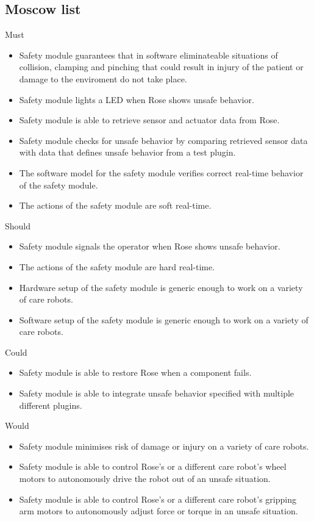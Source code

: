 \documentclass[12pt]{scrreprt}
\begin{document}
\subsection{Moscow list}
\label{MoSCoW list}
\begin{description}
\item Must
    \begin{itemize}
        \item Safety module guarantees that in software eliminateable situations of collision, clamping and pinching that could result in injury of the patient or damage to the enviroment do not take place. 
        \item Safety module lights a LED when Rose shows unsafe behavior.
        \item Safety module is able to retrieve sensor and actuator data from Rose.
        \item Safety module checks for unsafe behavior by comparing retrieved sensor data with data that defines unsafe behavior from a test plugin.
        \item The software model for the safety module verifies correct real-time behavior of the safety module.
        \item The actions of the safety module are soft real-time.
    \end{itemize}
\item Should
    \begin{itemize}
        \item Safety module signals the operator when Rose shows unsafe behavior.
        \item The actions of the safety module are hard real-time.
        \item Hardware setup of the safety module is generic enough to work on a variety of care robots.
        \item Software setup of the safety module is generic enough to work on a variety of care robots.
    \end{itemize}
\item Could
    \begin{itemize}
        \item Safety module is able to restore Rose when a component fails.
        \item Safety module is able to integrate unsafe behavior specified with multiple different plugins.
    \end{itemize}
\item Would
    \begin{itemize}
        \item Safety module minimises risk of damage or injury on a variety of care robots.
        \item Safety module is able to control Rose's or a different care robot's wheel motors to autonomously drive the robot out of an unsafe situation.
        \item Safety module is able to control Rose's or a different care robot's gripping arm motors to autonomously adjust force or torque in an unsafe situation.
    \end{itemize}
\end{description}
\end{document}
